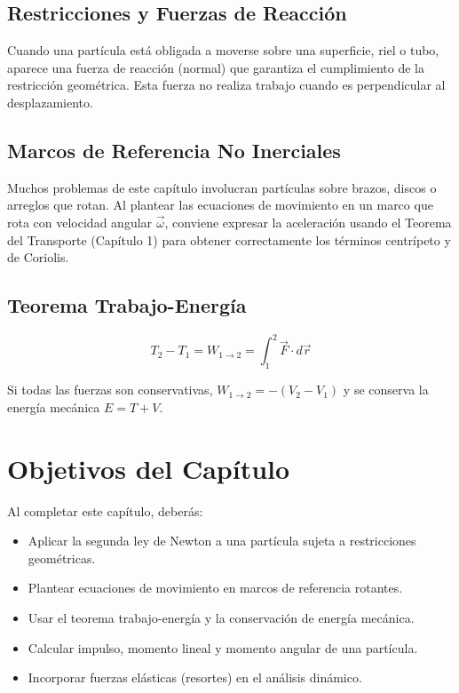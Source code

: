 \subsection*{Restricciones y Fuerzas de Reacción}

Cuando una partícula está obligada a moverse sobre una superficie, riel o tubo, aparece una fuerza de reacción (normal) que garantiza el cumplimiento de la restricción geométrica. Esta fuerza no realiza trabajo cuando es perpendicular al desplazamiento.

\subsection*{Marcos de Referencia No Inerciales}

Muchos problemas de este capítulo involucran partículas sobre brazos, discos o arreglos que rotan. Al plantear las ecuaciones de movimiento en un marco que rota con velocidad angular $\vec{\omega}$, conviene expresar la aceleración usando el Teorema del Transporte (Capítulo 1) para obtener correctamente los términos centrípeto y de Coriolis.

\subsection*{Teorema Trabajo-Energía}

$$T_2 - T_1 = W_{1\to2} = \int_1^2 \vec{F} \cdot d\vec{r}$$

Si todas las fuerzas son conservativas, $W_{1\to 2} = -(V_2 - V_1)$ y se conserva la energía mecánica $E = T + V$.

\section*{Objetivos del Capítulo}

Al completar este capítulo, deberás:
\begin{itemize}
    \item Aplicar la segunda ley de Newton a una partícula sujeta a restricciones geométricas.
    \item Plantear ecuaciones de movimiento en marcos de referencia rotantes.
    \item Usar el teorema trabajo-energía y la conservación de energía mecánica.
    \item Calcular impulso, momento lineal y momento angular de una partícula.
    \item Incorporar fuerzas elásticas (resortes) en el análisis dinámico.
\end{itemize}

\newpage
